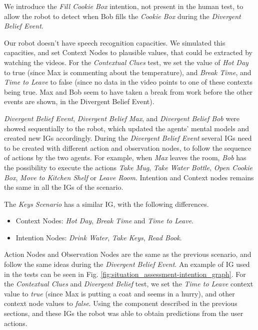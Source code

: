 We introduce the \textit{Fill Cookie Box} intention, not present in the human test, to allow the robot to detect when Bob fills the \textit{Cookie Box} during the \textit{Divergent Belief Event}.

Our robot doesn't have speech recognition capacities. We simulated this capacities, and set Context Nodes to plausible values, that could be extracted by watching the videos. For the \textit{Contextual Clues} test, we set the value of \textit{Hot Day} to true (since Max is commenting about the temperature), and \textit{Break Time}, and \textit{Time to Leave} to false (since no data in the video points to one of these contexts being true. Max and Bob seem to have taken a break from work before the other events are shown, in the Divergent Belief Event).

\textit{Divergent Belief Event}, \textit{Divergent Belief Max}, and \textit{Divergent Belief Bob} were showed sequentially to the robot, which updated the agents' mental models and created new IGs accordingly. During the \textit{Divergent Belief Event} several IGs need to be created with different action and observation nodes, to follow the sequence of actions by the two agents. For example, when \textit{Max} leaves the room, \textit{Bob} has the possibility to execute the actions \textit{Take Mug}, \textit{Take Water Bottle}, \textit{Open Cookie Box}, \textit{Move to Kitchen Shelf} or \textit{Leave Room}. Intention and Context nodes remains the same in all the IGs of the scenario.


The \textit{Keys Scenario} has a similar IG, with the following differences.
\begin{itemize}
\item Context Nodes: \textit{Hot Day}, \textit{Break Time} and \textit{Time to Leave}.
\item Intention Nodes: \textit{Drink Water}, \textit{Take Keys}, \textit{Read Book}.
\end{itemize}

Action Nodes and Observation Nodes are the same as the previous scenario, and follow the same ideas during the \textit{Divergent Belief Event}. An example of IG used in the tests can be seen in Fig. \ref{fig:situation_assessment-intention_graph}. For the \textit{Contextual Clues} and \textit{Divergent Belief} test, we set the \textit{Time to Leave} context value to \textit{true} (since Max is putting a coat and seems in a hurry), and other context node values to \textit{false}. Using the component described in the previous sections, and these IGs the robot was able to obtain predictions from the user actions.

